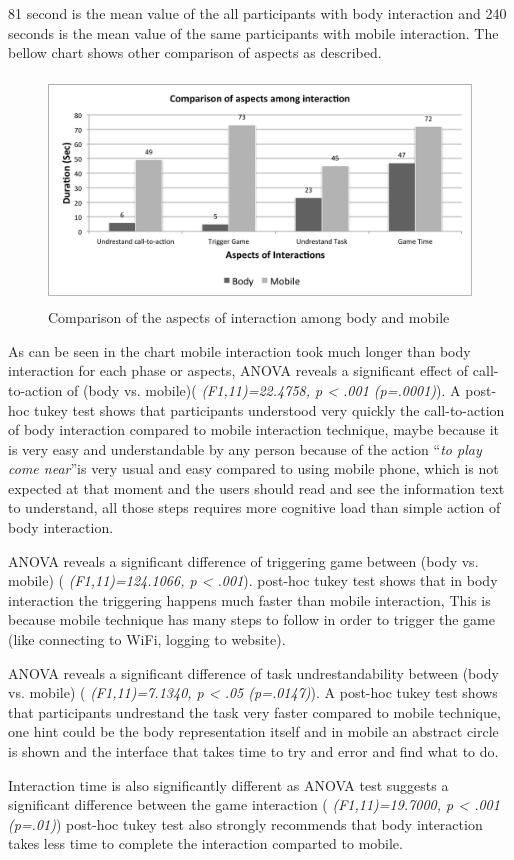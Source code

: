 \begin{itemize}
81 second is the mean value of the all participants with body interaction and 240 seconds is the mean value of the same participants with mobile interaction. The bellow chart shows other comparison of aspects as described.

\begin{figure}[H]
\centering
\includegraphics[width=12cm,height=6cm]{Figures/6/mobile_body_aspect}%
 \caption{Comparison of the aspects of interaction among body and mobile }%
 \label{fig:mobile_body_aspect}%
\end{figure}


As can be seen in the chart mobile interaction took much longer than body interaction for each phase or aspects, ANOVA reveals a significant effect of call-to-action of (body vs. mobile)( \emph{(F1,11)=22.4758, p < .001 (p=.0001)}). A post-hoc tukey test shows that participants understood very quickly the call-to-action of body interaction compared to mobile interaction technique, maybe because it is very easy and understandable by any person because of the action ``\emph{to play come near}''is very usual and easy compared to using mobile phone, which is not expected at that moment and the users should read and see the information text to understand, all those steps requires more cognitive load than simple action of body interaction.

ANOVA reveals a significant difference of triggering game between (body vs. mobile) ( \emph{(F1,11)=124.1066, p < .001}). post-hoc tukey test shows that in body interaction the triggering happens much faster than mobile interaction, This is because mobile technique has many steps to follow in order to trigger the game (like connecting to WiFi, logging to website).


ANOVA reveals a significant difference of task undrestandability between (body vs. mobile) ( \emph{(F1,11)=7.1340, p < .05 (p=.0147)}). A post-hoc tukey test shows that participants undrestand the task very faster compared to mobile technique, one hint could be the body representation itself and in mobile an abstract circle is shown and the interface that takes time to try and error and find what to do.

Interaction time is also significantly different as ANOVA test suggests a significant difference between the game interaction ( \emph{(F1,11)=19.7000, p < .001 (p=.01)}) post-hoc tukey test also strongly recommends that body interaction takes less time to complete the interaction comparted to mobile.



\end{itemize}



